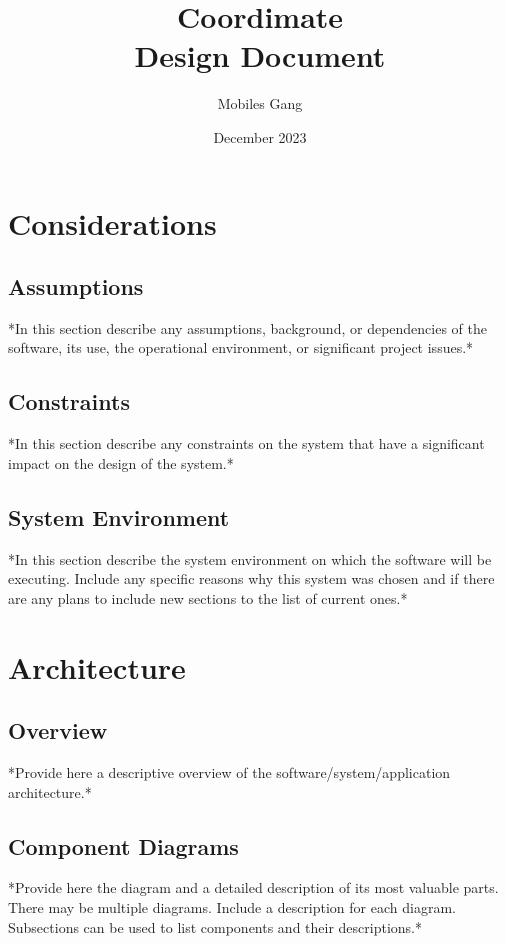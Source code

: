 \documentclass{article}
\title{Coordimate\\Design Document}
\date{December 2023}
\author{Mobiles Gang}
\begin{document}
\maketitle

\section{Considerations}

\subsection{Assumptions}

*In this section describe any assumptions, background, or dependencies of the
software, its use, the operational environment, or significant project issues.*

\subsection{Constraints}

*In this section describe any constraints on the system that have a significant
impact on the design of the system.*

\subsection{System Environment}

*In this section describe the system environment on which the software will be
executing. Include any specific reasons why this system was chosen and if there
are any plans to include new sections to the list of current ones.*


\section{Architecture}

\subsection{Overview}

*Provide here a descriptive overview of the software/system/application
architecture.*

\subsection{Component Diagrams}

*Provide here the diagram and a detailed description of its most valuable
parts. There may be multiple diagrams. Include a description for each diagram.
Subsections can be used to list components and their descriptions.*
\end{document}
